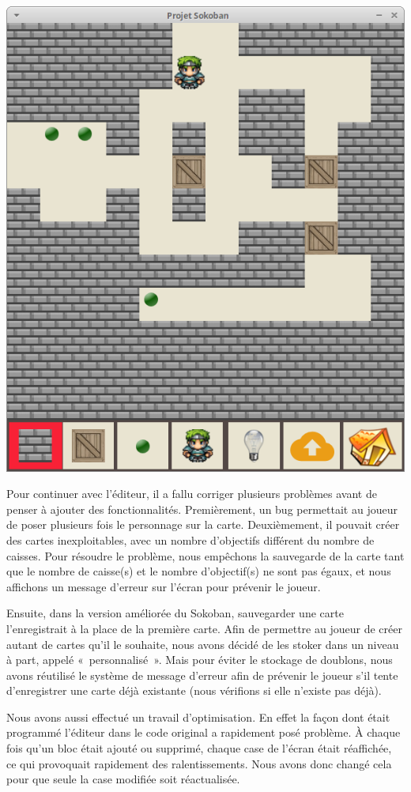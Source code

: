 \documentclass[english,11pt]{report}
\begin{document}
\begin{center}
\includegraphics[scale=0.4]{editeur}
\end{center}
\vspace{0.2cm}
\par
Pour continuer avec l’éditeur, il a fallu corriger plusieurs problèmes avant de penser à ajouter des fonctionnalités. Premièrement, un bug permettait au joueur de poser plusieurs fois le personnage sur la carte. Deuxièmement, il pouvait créer des cartes inexploitables, avec un nombre d’objectifs différent du nombre de caisses. Pour résoudre le problème, nous empêchons la sauvegarde de la carte tant que le nombre de caisse(s) et le nombre d’objectif(s) ne sont pas égaux, et nous affichons un message d’erreur sur l’écran pour prévenir le joueur.\par
\vspace{0.2cm}
Ensuite, dans la version améliorée du Sokoban, sauvegarder une carte l’enregistrait à la place de la première carte. Afin de permettre au joueur de créer autant de cartes qu’il le souhaite, nous avons décidé de les stoker dans un niveau à part, appelé « personnalisé ». Mais pour éviter le stockage de doublons, nous avons réutilisé le système de message d’erreur afin de prévenir le joueur s’il tente d’enregistrer une carte déjà existante (nous vérifions si elle n’existe pas déjà).\par
\vspace{0.2cm}
Nous avons aussi effectué un travail d’optimisation. En effet la façon dont était programmé l’éditeur dans le code original a rapidement posé problème. À chaque fois qu’un bloc était ajouté ou supprimé, chaque case de l’écran était réaffichée, ce qui provoquait rapidement des ralentissements. Nous avons donc changé cela pour que seule la case modifiée soit réactualisée.\par
\end{document}
